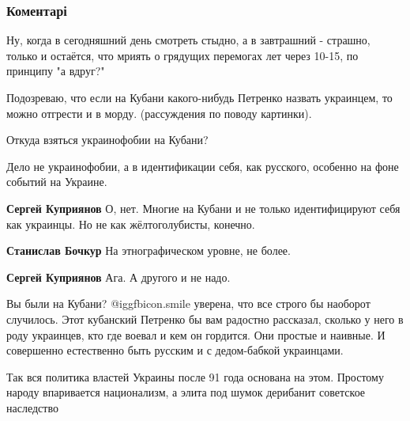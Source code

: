  
 
 
 
 
\subsubsection{Коментарі}

\begin{itemize} %

Ну, когда в сегодняшний день смотреть стыдно, а в завтрашний - страшно, только
и остаётся, что мриять о грядущих перемогах лет через 10-15, по принципу "а
вдруг?"


Подозреваю, что если на Кубани какого-нибудь Петренко назвать украинцем, то
можно отгрести и в морду. (рассуждения по поводу картинки).

\begin{itemize} %
Откуда взяться украинофобии на Кубани?

Дело не украинофобии, а в идентификации себя, как русского, особенно на фоне событий на Украине.

\textbf{Сергей Куприянов} О, нет. Многие на Кубани и не только идентифицируют себя как украинцы. Но не как жёлтоголубисты, конечно.

\textbf{Станислав Бочкур} На этнографическом уровне, не более.

\textbf{Сергей Куприянов} Ага. А другого и не надо.


Вы были на Кубани?  @igg{fbicon.smile}  уверена, что все строго бы наоборот случилось. Этот
кубанский Петренко бы вам радостно рассказал, сколько у него в роду украинцев,
кто где воевал и кем он гордится. Они простые и наивные. И совершенно
естественно быть русским и с дедом-бабкой украинцами.

\end{itemize} %


Так вся политика властей Украины после 91 года основана на этом. Простому
народу впаривается национализм, а элита под шумок дерибанит советское
наследство


\end{itemize}
